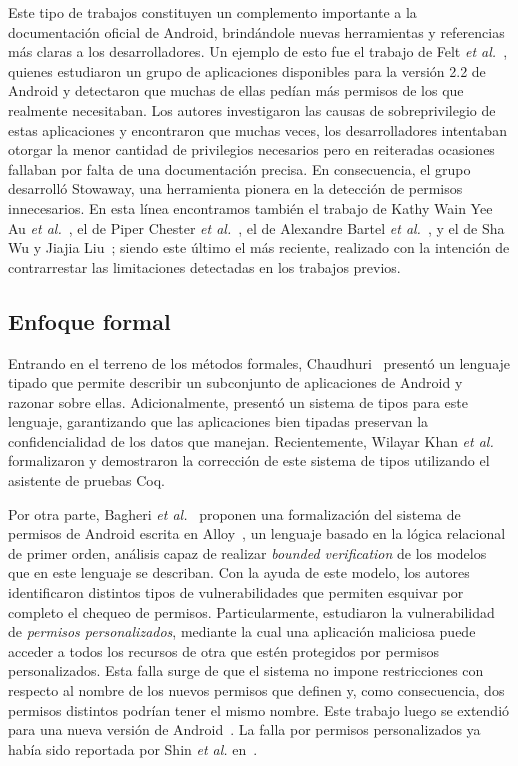 Este tipo de trabajos constituyen un complemento importante a la documentación
oficial de Android, brindándole nuevas herramientas y referencias más claras a
los desarrolladores. Un ejemplo de esto fue el trabajo de Felt \textit{et
al.}~\cite{felt}, quienes estudiaron un grupo de aplicaciones disponibles para
la versión 2.2 de Android y detectaron que muchas de ellas pedían más permisos
de los que realmente necesitaban. Los autores investigaron las causas de
sobreprivilegio de estas aplicaciones y encontraron que muchas veces, los
desarrolladores intentaban otorgar la menor cantidad de privilegios necesarios
pero en reiteradas ocasiones fallaban por falta de una documentación precisa. En
consecuencia, el grupo desarrolló Stowaway, una herramienta pionera en la
detección de permisos innecesarios. En esta línea encontramos también el trabajo
de Kathy Wain Yee Au \textit{et al.}~\cite{pscout}, el de Piper Chester
\textit{et al.}~\cite{mperm}, el de Alexandre Bartel \textit{et
al.}~\cite{bartel}, y el de Sha Wu y Jiajia Liu~\cite{droidtector}; siendo este
último el más reciente, realizado con la intención de contrarrestar las
limitaciones detectadas en los trabajos previos.
%
%

\subsection*{Enfoque formal}

Entrando en el terreno de los métodos formales, Chaudhuri~\cite{chaudhuri}
presentó un lenguaje tipado que permite describir un subconjunto de aplicaciones
de Android y razonar sobre ellas. Adicionalmente, presentó un sistema de tipos
para este lenguaje, garantizando que las aplicaciones bien tipadas preservan la
confidencialidad de los datos que manejan. Recientemente, Wilayar Khan
\textit{et al.}~\cite{khan} formalizaron y demostraron la corrección de este
sistema de tipos utilizando el asistente de pruebas Coq.

Por otra parte, Bagheri \textit{et al.}~\cite{bagheri15} proponen una
formalización del sistema de permisos de Android escrita en Alloy~\cite{alloy},
un lenguaje basado en la lógica relacional de primer orden,
%
%
análisis capaz de realizar \textit{bounded verification} de los modelos que en
este lenguaje se describan. Con la ayuda de este modelo, los autores
identificaron distintos tipos de vulnerabilidades que permiten esquivar por
completo el chequeo de permisos. Particularmente, estudiaron la vulnerabilidad
%
%
de \textit{permisos personalizados}, mediante la cual una aplicación maliciosa
puede acceder a todos los recursos de otra que estén protegidos por permisos
personalizados. Esta falla surge de que el sistema no impone restricciones con
respecto al nombre de los nuevos permisos que definen y, como consecuencia, dos
permisos distintos podrían tener el mismo nombre. Este trabajo luego se extendió
para una nueva versión de Android~\cite{bagheri}. La falla por permisos
personalizados ya había sido reportada por Shin \textit{et al.}
en~\cite{shin-custom}.

